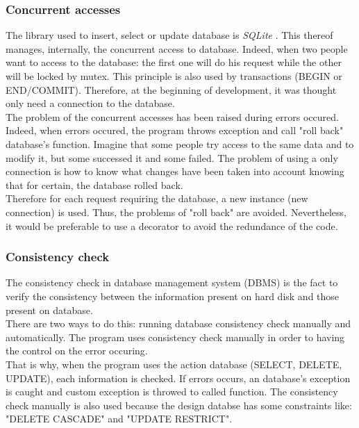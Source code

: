 \subsubsection{Concurrent accesses}
\setlength{\parindent}{1cm}
\hspace{1cm}
The library used to insert, select or update database is
\emph{SQLite} \cite{SQLite}. This thereof manages, internally,
the concurrent access to database. Indeed, when two people want to
access to the database: the first one will do his request while
the other will be locked by mutex. This principle is also used by transactions
(BEGIN or END/COMMIT).
Therefore, at the beginning of development, it was thought only need a
connection to the database.\\
The problem of the concurrent accesses has been raised during errors occured.
Indeed, when errors occured, the program throws exception and call "roll back"
database's function. Imagine that some people try access to the same data and to
modify it, but some successed it and some failed. The problem of using a only
connection is how to know what changes have been taken into account knowing
that for certain, the database rolled back.\\
Therefore for each request requiring the database,
a new instance (new connection) is used. Thus, the problems
of "roll back" are avoided. Nevertheless, it would be preferable to use a decorator
to avoid the redundance of the code.

\subsubsection{Consistency check}

The consistency check in database management system (DBMS) is the fact
to verify the consistency between the information present on hard disk and
those present on database.\\
There are two ways to do this: running database consistency check manually and
automatically. The program uses consistency check manually in order to
having the control on the error occuring.\\
That is why, when the program uses the action database (SELECT, DELETE, UPDATE),
each information is checked. If errors occurs, an database's exception is caught
and custom exception is throwed to called function.
The consistency check manually is also used because the design databse
has some constraints like: "DELETE CASCADE" and "UPDATE RESTRICT".

